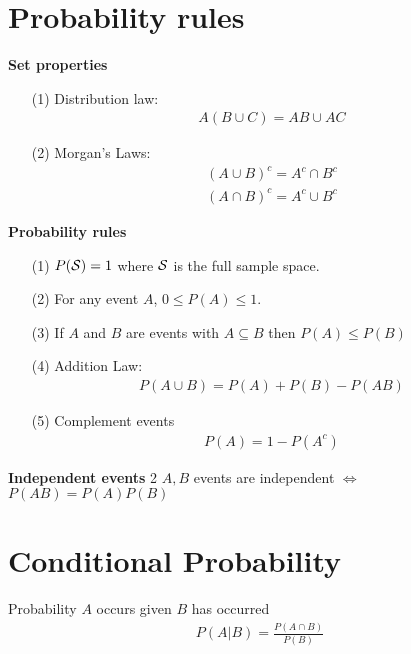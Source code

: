 \documentclass[16pt,a4paper]{article}
\begin{document}
\section{Probability rules}
\begin{thm}{\textbf{Set properties}}
\begin{enumerate}
\item[(1)] Distribution law: 
\begin{align*}
A(B \cup C) = AB \cup AC
\end{align*} 
\item[(2)] Morgan’s Laws: 
\begin{align*}
(A\cup B)^c = A^c \cap B^c \\
(A\cap B)^c = A^c \cup B^c
\end{align*}
\end{enumerate}
\end{thm}
\begin{defn}{\textbf{Probability rules}}
\begin{enumerate}
\item[(1)] $P({\cal S}) = 1$ where $\cal S$ is the full sample space. 
\item[(2)] For any event $A$, $0 \leq P(A) \leq 1$. 
\item[(3)] If $A$ and $B$ are events with $A\subseteq B$ then $P(A) \leq P(B)$
\item[(4)] Addition Law: 
\begin{align*}
P(A \cup B) = P(A) + P(B) - P(AB)
\end{align*}
\item[(5)] Complement events
\begin{align*}
P(A) = 1-P(A^c)
\end{align*}
\end{enumerate}
\end{defn}

\begin{defn}{\textbf{Independent events}}
2 $A,B$ events are independent $\iff$ $P(AB) = P(A)P(B)$
\end{defn}

\newpage
\section{Conditional Probability}
\begin{defn}{Probability $A$ occurs given $B$ has occurred}
\begin{align*}
P(A\vert B) = \frac{P(A\cap B)}{P(B)}
\end{align*}
\end{defn}
\end{document}
